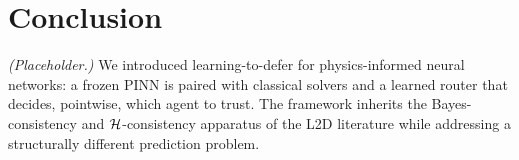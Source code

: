 \section{Conclusion}
\label{sec:conclusion}

\emph{(Placeholder.)} We introduced learning-to-defer for physics-informed
neural networks: a frozen PINN is paired with classical solvers and a
learned router that decides, pointwise, which agent to trust. The framework
inherits the Bayes-consistency and $\mathcal{H}$-consistency apparatus of the L2D
literature while addressing a structurally different prediction problem.
